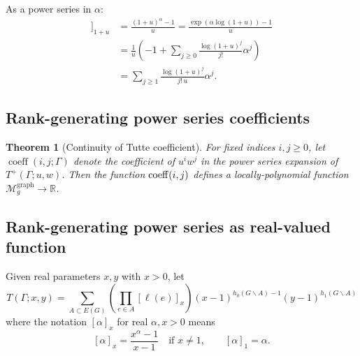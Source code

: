 \documentclass{amsart}
\newtheorem{thm}{Theorem}
\theoremstyle{definition}
\newcommand{\RR}{\mathbb{R}}
\DeclareMathOperator{\coeff}{coeff}
\newcommand{\fanalog}[2]{[\![#2]\!]_{#1}}
\newcommand{\analog}[2]{[#2]_{#1}}
\newcommand{\Mgraphg}{\mathcal M_g^{\mathrm{graph}}}
\begin{document}
As a power series in $\alpha$:
\begin{align*}
\fanalog{1 + u}{\alpha} &= \frac{(1+u)^\alpha - 1}{u}
= \frac{\exp(\alpha \log(1+u)) - 1}{u} \\
&= \frac1{u} \left( -1 + \sum_{j\geq 0} \frac{\log(1+u)^j}{j!} \alpha^j\right) \\
&= \sum_{j\geq 1} \frac{\log(1+u)^j}{j! \, u} \alpha^j .
\end{align*}


\subsection{Rank-generating power series coefficients}
\begin{thm}[Continuity of Tutte coefficient]
For fixed indices $i,j\geq 0$,
let $\coeff(i,j; \Gamma)$
denote the coefficient of $u^i w^j$ in the power series expansion of $T^+(\Gamma; u,w)$.
Then the function ${\rm coeff}(i,j)$
defines a locally-polynomial 
function $\Mgraphg \to \RR$.
\end{thm}

\subsection{Rank-generating power series as real-valued function}
Given real parameters $x,y$ with $x > 0$,
let 
\begin{equation}
\label{eq:tutte-metric-graph}
	T(\Gamma; x,y) = \sum_{A \subset E(G)} \left( \prod_{e \in A} \analog{x}{\ell(e)} \right)
	(x-1)^{h_0(G\backslash A) - 1}(y-1)^{h_1(G\backslash A)}
\end{equation}
where the notation $\analog{x}{\alpha}$ for real $\alpha, x > 0$ means
\begin{equation*}
\label{eq:q-analog-real}
	\analog{x}{\alpha} = \frac{x^\alpha - 1}{x-1}
	\quad\text{if } x \neq 1,
	\qquad 
	\analog{1}{\alpha} = \alpha.
\end{equation*}

\end{document}
